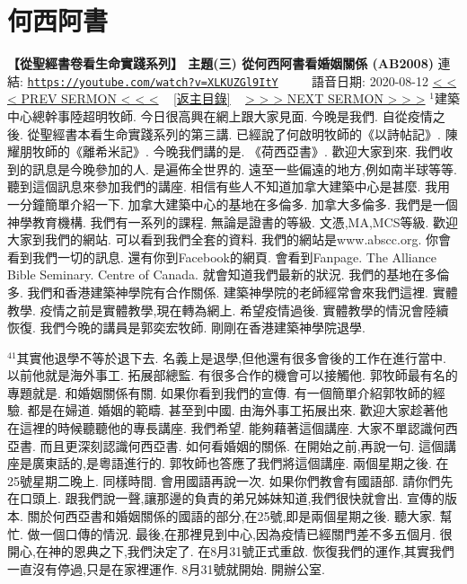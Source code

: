 \documentclass{book}
\begin{document}
\section{何西阿書}
\label{sec:XLKUZGl9ItY}
\textbf{【從聖經書卷看生命實踐系列】 主題(三) 從何西阿書看婚姻關係 (AB2008)}
\newline
\newline
連結: \href{https://youtube.com/watch?v=XLKUZGl9ItY}{\texttt{https://youtube.com/watch?v=XLKUZGl9ItY}} ~~~~ 語音日期: 2020-08-12
\newline
\newline
\hyperref[sec:P0Y2lvzICsM]{\small{< < < PREV SERMON < < <}}
~
\hyperref[sec:index]{\small{[返主目錄]}}
~
\hyperref[sec:n5DpA1Db_0M]{\small{> > > NEXT SERMON > > >}}
\newline
\newline
$^{1}$建築中心總幹事陸超明牧師.
今日很高興在網上跟大家見面.
今晚是我們.
自從疫情之後.
從聖經書本看生命實踐系列的第三講.
已經說了何啟明牧師的《以詩帖記》.
陳耀朋牧師的《離希米記》.
今晚我們講的是.
《荷西亞書》.
歡迎大家到來.
我們收到的訊息是今晚參加的人.
是遍佈全世界的.
遠至一些偏遠的地方,例如南半球等等.
聽到這個訊息來參加我們的講座.
相信有些人不知道加拿大建築中心是甚麼.
我用一分鐘簡單介紹一下.
加拿大建築中心的基地在多倫多.
加拿大多倫多.
我們是一個神學教育機構.
我們有一系列的課程.
無論是證書的等級.
文憑,MA,MCS等級.
歡迎大家到我們的網站.
可以看到我們全套的資料.
我們的網站是www.abscc.org.
你會看到我們一切的訊息.
還有你到Facebook的網頁.
會看到Fanpage.
The Alliance Bible Seminary.
Centre of Canada.
就會知道我們最新的狀況.
我們的基地在多倫多.
我們和香港建築神學院有合作關係.
建築神學院的老師經常會來我們這裡.
實體教學.
疫情之前是實體教學,現在轉為網上.
希望疫情過後.
實體教學的情況會陸續恢復.
我們今晚的講員是郭奕宏牧師.
剛剛在香港建築神學院退學.

$^{41}$其實他退學不等於退下去.
名義上是退學,但他還有很多會後的工作在進行當中.
以前他就是海外事工.
拓展部總監.
有很多合作的機會可以接觸他.
郭牧師最有名的專題就是.
和婚姻關係有關.
如果你看到我們的宣傳.
有一個簡單介紹郭牧師的經驗.
都是在婦道.
婚姻的範疇.
甚至到中國.
由海外事工拓展出來.
歡迎大家趁著他在這裡的時候聽聽他的專長講座.
我們希望.
能夠藉著這個講座.
大家不單認識何西亞書.
而且更深刻認識何西亞書.
如何看婚姻的關係.
在開始之前,再說一句.
這個講座是廣東話的,是粵語進行的.
郭牧師也答應了我們將這個講座.
兩個星期之後.
在25號星期二晚上.
同樣時間.
會用國語再說一次.
如果你們教會有國語部.
請你們先在口頭上.
跟我們說一聲,讓那邊的負責的弟兄姊妹知道,我們很快就會出.
宣傳的版本.
關於何西亞書和婚姻關係的國語的部分,在25號,即是兩個星期之後.
聽大家.
幫忙.
做一個口傳的情況.
最後,在那裡見到中心,因為疫情已經關門差不多五個月.
很開心,在神的恩典之下,我們決定了.
在8月31號正式重啟.
恢復我們的運作,其實我們一直沒有停過,只是在家裡運作.
8月31號就開始.
開辦公室.
\end{document}
